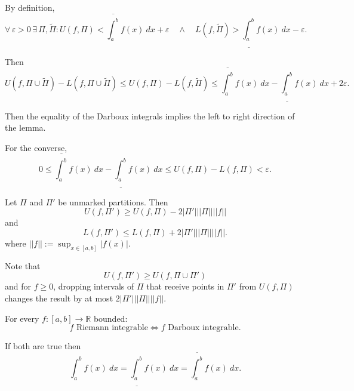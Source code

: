 \documentclass{notes}
\begin{document}
\begin{prf}
  By definition, 
  \[
    \forall \, \varepsilon > 0 \, \exists \, \Pi, \tilde \Pi: U(f, \Pi) < \overline{\int_a^b} f(x)\ dx + \varepsilon \quad \land \quad L(f, \tilde \Pi) > \underline{\int_a^b} f(x)\ dx - \varepsilon.
  \]
  
  Then 
  \[
    U(f, \Pi \cup \tilde \Pi) - L(f, \Pi \cup \tilde \Pi) \leq U(f, \Pi) - L(f, \tilde \Pi) \leq \overline{\int_a^b} f(x)\ dx - \underline{\int_a^b} f(x)\ dx + 2 \varepsilon.
  \]
  
  Then the equality of the Darboux integrals implies the left to right direction of the lemma.
  
  For the converse, 
  \[
    0 \leq \overline{\int_a^b} f(x)\ dx - \underline{\int_a^b} f(x)\ dx \leq U(f, \Pi) - L(f, \Pi) < \varepsilon.
  \]
\end{prf}

\begin{lem}
  Let $\Pi$ and $\Pi'$ be unmarked partitions.
  Then 
  \[
    U(f, \Pi') \geq U(f, \Pi) - 2 \left | \Pi' \right | ||\Pi|| ||f||
  \]
  and 
  \[
    L(f, \Pi') \leq L(f, \Pi) + 2 \left | \Pi' \right | ||\Pi|| ||f||.
  \]
  where $||f|| := \sup_{x \in [a, b]} \left | f(x) \right |$.
\end{lem}

\begin{prf}
  Note that 
  \[
    U(f, \Pi') \geq U(f, \Pi \cup \Pi')
  \]
  and for $f \geq 0$, dropping intervals of $\Pi$ that receive points in $\Pi'$ from $U(f, \Pi)$ changes the result by at most $2 \left | \Pi' \right | ||\Pi|| ||f||$.
\end{prf}

\begin{thm}
  For every $f \colon [a, b] \to \mathbb R$ bounded: 
  \[
    \text{$f$ Riemann integrable} \Leftrightarrow \text{$f$ Darboux integrable}.
  \]
  
  If both are true then 
  \[
    \int_a^b f(x)\ dx = \underline{\int_a^b} f(x)\ dx = \overline{\int_a^b} f(x)\ dx.
  \]
\end{thm}
\end{document}
